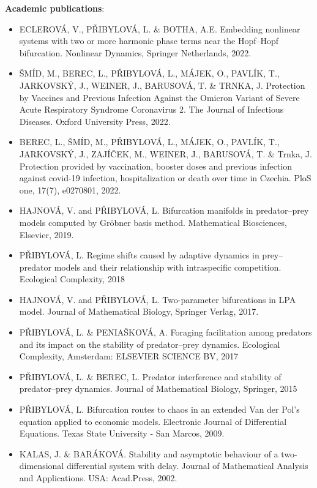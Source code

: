 \documentclass[a4paper,11pt]{scrartcl}
\begin{document}
\textbf{Academic publications}:
\begin{itemize}
    \item ECLEROVÁ, V., PŘIBYLOVÁ, L. \& BOTHA, A.E. Embedding nonlinear systems with two or more harmonic phase terms near the Hopf–Hopf bifurcation. Nonlinear Dynamics, Springer Netherlands, 2022.
    \item ŠMÍD, M., BEREC, L., PŘIBYLOVÁ, L., MÁJEK, O., PAVLÍK, T., JARKOVSKÝ, J., WEINER, J., BARUSOVÁ, T. \& TRNKA, J. Protection by Vaccines and Previous Infection Against the Omicron Variant of Severe Acute Respiratory Syndrome Coronavirus 2. The Journal of Infectious Diseases. Oxford University Press, 2022.
    \item BEREC, L., ŠMÍD, M., PŘIBYLOVÁ, L., MÁJEK, O., PAVLÍK, T., JARKOVSKÝ, J., ZAJÍČEK, M., WEINER, J., BARUSOVÁ, T. \& Trnka, J. Protection provided by vaccination, booster doses and previous infection against covid-19 infection, hospitalization or death over time in Czechia. PloS one, 17(7), e0270801, 2022.
    \item HAJNOVÁ, V. and PŘIBYLOVÁ, L. Bifurcation manifolds in predator–prey models computed by Gröbner basis method. Mathematical Biosciences, Elsevier, 2019.
    \item PŘIBYLOVÁ, L. Regime shifts caused by adaptive dynamics in prey–predator models and their relationship with intraspecific competition. Ecological Complexity, 2018
    \item HAJNOVÁ, V. and PŘIBYLOVÁ, L. Two-parameter bifurcations in LPA model. Journal of Mathematical Biology, Springer Verlag, 2017.
    \item PŘIBYLOVÁ, L. \& PENIAŠKOVÁ, A. Foraging facilitation among predators and its impact on the stability of predator–prey dynamics. Ecological Complexity, Amsterdam: ELSEVIER SCIENCE BV, 2017
    \item PŘIBYLOVÁ, L. \& BEREC, L. Predator interference and stability of predator–prey dynamics. Journal of Mathematical Biology, Springer, 2015
    \item PŘIBYLOVÁ, L. Bifurcation routes to chaos in an extended Van der Pol's equation applied to economic models. Electronic Journal of Differential Equations. Texas State University - San Marcos, 2009.
    \item KALAS, J. \& BARÁKOVÁ. Stability and asymptotic behaviour of a two-dimensional differential system with delay. Journal of Mathematical Analysis and Applications. USA: Acad.Press, 2002.
\end{itemize}

\end{document}
